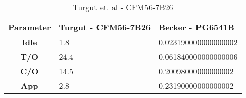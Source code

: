 \begin{table}[h!]
  \centering
  \begin{tabularx}{\textwidth}{||c|X|X||}
  \hline
    \cellcolor{gray!20}\textbf{Parameter} & \cellcolor{gray!20}\textbf{Turgut - CFM56-7B26} & \cellcolor{gray!20}\textbf{Becker - PG6541B} \\ [0.5ex]
  \hline\hline
\centering
    \cellcolor{gray!20}\textbf{Idle} & 1.8 & 0.023190000000000002 \\
  \hline
    \cellcolor{gray!20}\textbf{T/O} & 24.4 & 0.061840000000000006 \\
  \hline
    \cellcolor{gray!20}\textbf{C/O} & 14.5 & 0.20098000000000002 \\
  \hline
    \cellcolor{gray!20}\textbf{App} & 2.8 & 0.23190000000000002 \\
  \hline
  \end{tabularx}
  \caption{Turgut et. al - CFM56-7B26}
  \label{tab:exp}
\end{table}
